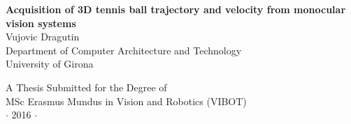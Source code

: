 
\newpage
\thispagestyle{empty}


\vspace*{2cm}
\begin{center}
{\Large\bf Acquisition of 3D tennis ball trajectory and velocity from monocular vision systems\\} \vspace{2cm} {\large
Vujovic Dragutin\\
\vspace{2cm}
Department of Computer Architecture and Technology \\
University of Girona}

\end{center}

\vspace{7cm}
\begin{center}
{\large A Thesis Submitted for the Degree of \\MSc Erasmus Mundus
in Vision and Robotics (VIBOT) \\\vspace{0.3cm} $\cdot$ 2016
$\cdot$}
\end{center}
\singlespacing


\begin{abstract}
Video annotations are successfully used in many sport related areas, including training, the media coverage and sport science. The key advantages of automatic annotation over conventional manual are speed, and robustness of gathered data. However, current automatic annotations systems are not always practical due installation cost and media rights. The proposed solution provides this kind of data from broadcast videos and single camera shots.\\

The main contribution of this work is acquisition of 3D trajectory and velocity of tennis ball, including players’ positions. The 3D trajectory acquisition is based on ball detection, field lines recognition and prior information about field dimension. The accuracy is tested on all four Grand Slam tournament matches, by available ground-truth data.

\vspace*{5cm}



\begin{center}
\begin{quote}
\it Research is what I'm doing when I don't know what I'm
doing.\,\ldots
\end{quote}
\end{center}
\hfill{\small Werner von Braun}

\end{abstract}

